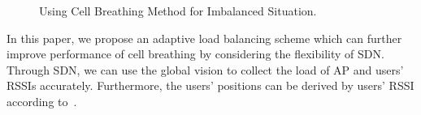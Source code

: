\begin{figure}
	\centering
		
	\caption{Using Cell Breathing Method for Imbalanced Situation.}
	\label{fig:cell-breathing}
\end{figure}

In this paper, we propose an adaptive load balancing scheme which can further improve performance of
cell breathing by considering the flexibility of SDN.
Through SDN, we can use the global vision to collect the load of AP and users' RSSIs accurately. 
Furthermore, the users' positions can be derived by users' RSSI according to~\cite{zaruba2007indoor}. 

